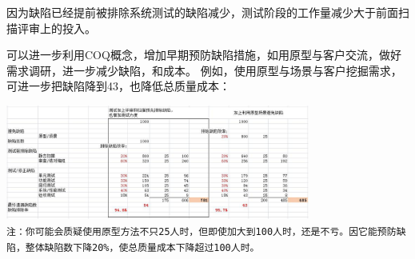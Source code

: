 
因为缺陷已经提前被排除系统测试的缺陷减少，测试阶段的工作量减少大于前面扫描评审上的投入。

可以进一步利用COQ概念，增加早期预防缺陷措施，如用原型与客户交流，做好需求调研，进一步减少缺陷，和成本。
例如，使用原型与场景与客户挖掘需求，可进一步把缺陷降到43，也降低总质量成本：


\includegraphics[width=10cm]{est缺陷表3.jpg}\\

\texttt{注：你可能会质疑使用原型方法不只25人时，但即使加大到100人时，还是不亏。因它能预防缺陷，整体缺陷数下降20\%，使总质量成本下降超过100人时。}


